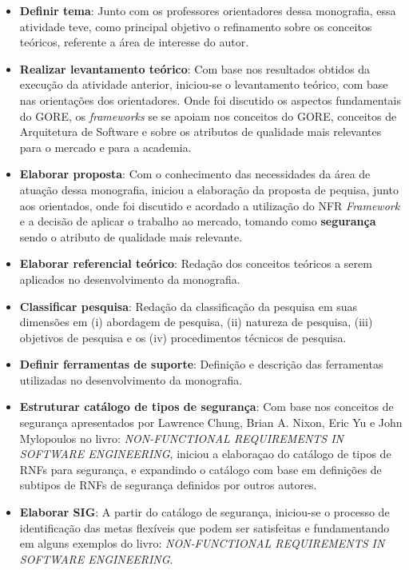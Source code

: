 \begin{itemize}
	\item \textbf{Definir tema}: Junto com os professores orientadores dessa monografia, essa atividade teve, como principal objetivo o refinamento sobre os conceitos teóricos, referente a área de interesse do autor.   
	
	\item \textbf{Realizar levantamento teórico}: Com base nos resultados obtidos da execução da atividade anterior, iniciou-se o levantamento teórico, com base nas orientações dos orientadores. Onde foi discutido os aspectos fundamentais do GORE, os \textit{frameworks} se se apoiam nos conceitos do GORE, conceitos de Arquitetura de Software e sobre os atributos de qualidade mais relevantes para o mercado e para a academia. 
	
	\item \textbf{Elaborar proposta}: Com o conhecimento das necessidades da área de atuação dessa monografia, iniciou a elaboração da proposta de pequisa, junto aos orientados, onde foi discutido e acordado a utilização do NFR \textit{Framework} e a decisão de aplicar o trabalho ao mercado, tomando como \textbf{segurança} sendo o atributo de qualidade mais relevante.  
	
	\item \textbf{Elaborar referencial teórico}: Redação dos conceitos teóricos a serem aplicados no desenvolvimento da monografia. 
	
	\item \textbf{Classificar pesquisa}: Redação  da classificação da pesquisa em suas dimensões em (i) abordagem de pesquisa,  (ii) natureza de pesquisa, (iii) objetivos de pesquisa e os (iv) procedimentos técnicos de pesquisa.  
	
	\item \textbf{Definir ferramentas de suporte}: Definição e descrição das ferramentas utilizadas no desenvolvimento da monografia.  
	
	\item \textbf{Estruturar catálogo de tipos de segurança}: Com base nos conceitos de segurança apresentados por Lawrence Chung, Brian A. Nixon, Eric Yu e John Mylopoulos no  livro: \textit{NON-FUNCTIONAL REQUIREMENTS
	IN SOFTWARE ENGINEERING}, iniciou a elaboraçao  do catálogo de tipos de RNFs para segurança, e expandindo o catálogo com base em definições de subtipos de RNFs de segurança definidos por outros autores.
	
	\item \textbf{Elaborar SIG}: A partir do catálogo de segurança, iniciou-se o processo de identificação das metas flexíveis que podem ser satisfeitas e fundamentando em alguns exemplos do livro: \textit{NON-FUNCTIONAL REQUIREMENTS IN SOFTWARE ENGINEERING}.
	

\end{itemize}
